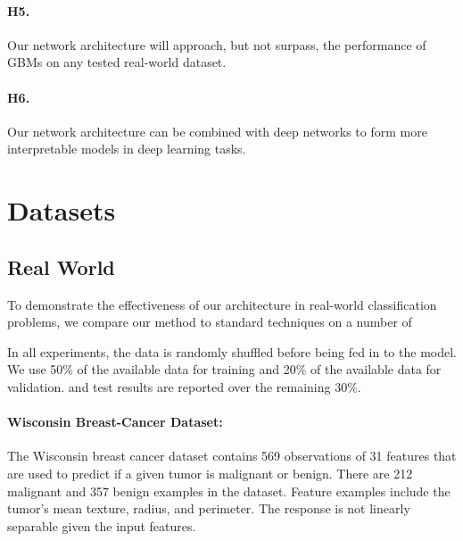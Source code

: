 \paragraph{H5.} Our network architecture will approach, but not surpass, the performance of GBMs on any tested real-world dataset. 

\paragraph{H6.} Our network architecture can be combined with deep networks to form more interpretable models in deep learning tasks. 



\section{Datasets}

\subsection{Real World}

To demonstrate the effectiveness of our architecture in real-world classification problems, we compare our method to standard techniques on a number of 

In all experiments, the data is randomly shuffled before being fed in to the model. We use 50\% of the available data for training and 20\% of the available data for validation.  and test results are reported over the remaining 30\%.

\paragraph{Wisconsin Breast-Cancer Dataset:} \citep{Street2005NuclearDiagnosis} The Wisconsin breast cancer dataset contains 569 observations of 31 features that are used to predict if a given tumor is malignant or benign. There are 212 malignant and 357 benign examples in the dataset. Feature examples include the tumor's mean texture, radius, and perimeter. The response is not linearly separable given the input features. 

